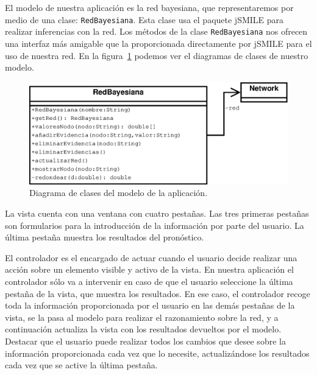\documentclass[a4paper,12pt]{article}
\begin{document}
\par
El modelo de nuestra aplicación es la red bayesiana,
que representaremos por medio de una clase: \texttt{RedBayesiana}.
Esta clase usa el paquete jSMILE para realizar inferencias con la red.
Los métodos de la clase \texttt{RedBayesiana} nos ofrecen una interfaz más amigable que la proporcionada directamente por jSMILE para el uso de nuestra red.
En la figura~\ref{fig:diagramaModelo} podemos ver el diagramas de clases de nuestro modelo.
\begin{figure}[h]
 \begin{center}
  \includegraphics[scale=0.5]{diagramaModelo.eps}
\caption{Diagrama de clases del modelo de la aplicación.}
\label{fig:diagramaModelo}
 \end{center}
\end{figure}

\par
La vista cuenta con una ventana con cuatro pestañas.
Las tres primeras pestañas son formularios para la introducción de la información por parte del usuario.
La última pestaña muestra los resultados del pronóstico.
\par
El controlador es el encargado de actuar cuando el usuario decide realizar una acción sobre un elemento visible y activo de la vista.
En nuestra aplicación el controlador sólo va a intervenir en caso de que el usuario seleccione la última pestaña de la vista, que muestra los resultados.
En ese caso, el controlador recoge toda la información proporcionada por el usuario en las demás pestañas de la vista,
se la pasa al modelo para realizar el razonamiento sobre la red,
y a continuación actualiza la vista con los resultados devueltos por el modelo.
\\
Destacar que el usuario puede realizar todos los cambios que desee sobre la información proporcionada cada vez que lo necesite,
actualizándose los resultados cada vez que se active la última pestaña.
\end{document}
